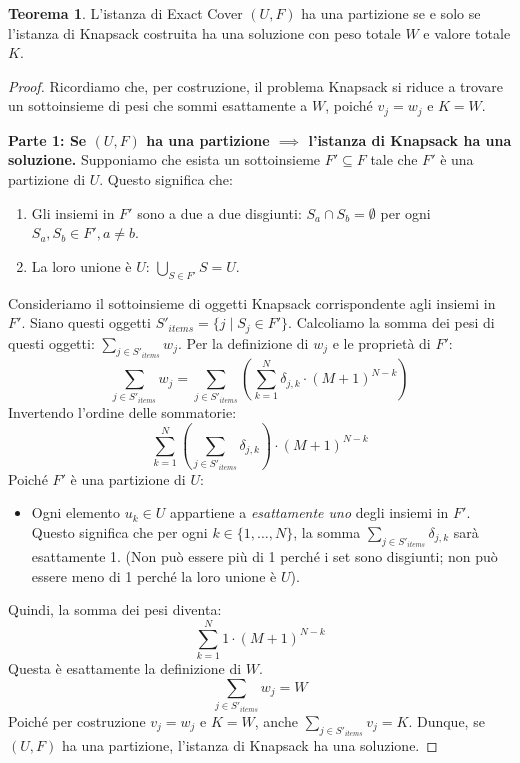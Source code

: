 \documentclass[a4paper]{article}
\theoremstyle{definition} %
\newtheorem{theorem}{Teorema}
\begin{document}
\begin{theorem}
L'istanza di Exact Cover $(U, F)$ ha una partizione se e solo se l'istanza di Knapsack costruita ha una soluzione con peso totale $W$ e valore totale $K$.
\end{theorem}
\begin{proof}
Ricordiamo che, per costruzione, il problema Knapsack si riduce a trovare un sottoinsieme di pesi che sommi esattamente a $W$, poiché $v_j=w_j$ e $K=W$.

\textbf{Parte 1: Se $(U, F)$ ha una partizione $\implies$ l'istanza di Knapsack ha una soluzione.}
Supponiamo che esista un sottoinsieme $F' \subseteq F$ tale che $F'$ è una partizione di $U$. Questo significa che:
\begin{enumerate}
    \item Gli insiemi in $F'$ sono a due a due disgiunti: $S_a \cap S_b = \emptyset$ per ogni $S_a, S_b \in F', a \neq b$.
    \item La loro unione è $U$: $\bigcup_{S \in F'} S = U$.
\end{enumerate}
Consideriamo il sottoinsieme di oggetti Knapsack corrispondente agli insiemi in $F'$. Siano questi oggetti $S'_{items} = \{j \mid S_j \in F'\}$.
Calcoliamo la somma dei pesi di questi oggetti: $\sum_{j \in S'_{items}} w_j$.
Per la definizione di $w_j$ e le proprietà di $F'$:
\[ \sum_{j \in S'_{items}} w_j = \sum_{j \in S'_{items}} \left( \sum_{k=1}^N \delta_{j,k} \cdot (M+1)^{N-k} \right) \]
Invertendo l'ordine delle sommatorie:
\[ \sum_{k=1}^N \left( \sum_{j \in S'_{items}} \delta_{j,k} \right) \cdot (M+1)^{N-k} \]
Poiché $F'$ è una partizione di $U$:
\begin{itemize}
    \item Ogni elemento $u_k \in U$ appartiene a \emph{esattamente uno} degli insiemi in $F'$. Questo significa che per ogni $k \in \{1, \ldots, N\}$, la somma $\sum_{j \in S'_{items}} \delta_{j,k}$ sarà esattamente 1. (Non può essere più di 1 perché i set sono disgiunti; non può essere meno di 1 perché la loro unione è $U$).
\end{itemize}
Quindi, la somma dei pesi diventa:
\[ \sum_{k=1}^N 1 \cdot (M+1)^{N-k} \]
Questa è esattamente la definizione di $W$.
\[ \sum_{j \in S'_{items}} w_j = W \]
Poiché per costruzione $v_j=w_j$ e $K=W$, anche $\sum_{j \in S'_{items}} v_j = K$.
Dunque, se $(U, F)$ ha una partizione, l'istanza di Knapsack ha una soluzione.


\end{proof}
\end{document}

